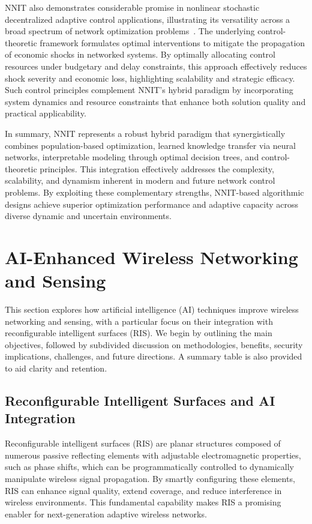 \documentclass[sigconf]{acmart}
\begin{document}
NNIT also demonstrates considerable promise in nonlinear stochastic decentralized adaptive control applications, illustrating its versatility across a broad spectrum of network optimization problems~\cite{ref40}. The underlying control-theoretic framework formulates optimal interventions to mitigate the propagation of economic shocks in networked systems. By optimally allocating control resources under budgetary and delay constraints, this approach effectively reduces shock severity and economic loss, highlighting scalability and strategic efficacy. Such control principles complement NNIT’s hybrid paradigm by incorporating system dynamics and resource constraints that enhance both solution quality and practical applicability.

In summary, NNIT represents a robust hybrid paradigm that synergistically combines population-based optimization, learned knowledge transfer via neural networks, interpretable modeling through optimal decision trees, and control-theoretic principles. This integration effectively addresses the complexity, scalability, and dynamism inherent in modern and future network control problems. By exploiting these complementary strengths, NNIT-based algorithmic designs achieve superior optimization performance and adaptive capacity across diverse dynamic and uncertain environments.

\section{AI-Enhanced Wireless Networking and Sensing}

This section explores how artificial intelligence (AI) techniques improve wireless networking and sensing, with a particular focus on their integration with reconfigurable intelligent surfaces (RIS). We begin by outlining the main objectives, followed by subdivided discussion on methodologies, benefits, security implications, challenges, and future directions. A summary table is also provided to aid clarity and retention.

\subsection{Reconfigurable Intelligent Surfaces and AI Integration}

Reconfigurable intelligent surfaces (RIS) are planar structures composed of numerous passive reflecting elements with adjustable electromagnetic properties, such as phase shifts, which can be programmatically controlled to dynamically manipulate wireless signal propagation. By smartly configuring these elements, RIS can enhance signal quality, extend coverage, and reduce interference in wireless environments. This fundamental capability makes RIS a promising enabler for next-generation adaptive wireless networks.
\end{document}
